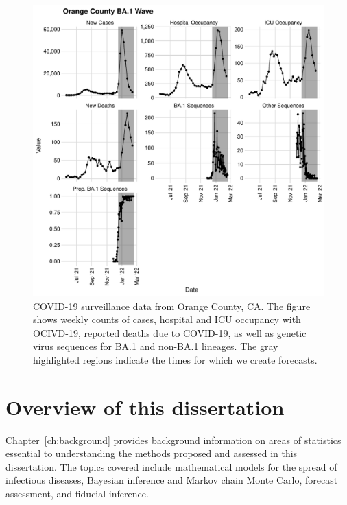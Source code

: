 \begin{figure}
    \centering
    \includegraphics[width=1.0\columnwidth]{figures/ch_5/orange_county_binned_data_plot.pdf}
    \caption[COVID-19 surveillance data from Orange County, California.]{
COVID-19 surveillance data from Orange County, CA.
The figure shows weekly counts of cases, hospital and ICU occupancy with OCIVD-19, reported deaths due to COVID-19, as well as genetic virus sequences for BA.1 and non-BA.1 lineages.
The gray highlighted regions indicate the times for which we create forecasts.}
    \label{ch_1:fig:orange_county_binned_data_plot}
\end{figure}

\section{Overview of this dissertation}
Chapter~\ref{ch:background} provides background information on areas of statistics essential to understanding the methods proposed and assessed in this dissertation.
The topics covered include mathematical models for the spread of infectious diseases, Bayesian inference and Markov chain Monte Carlo, forecast assessment, and fiducial inference.


